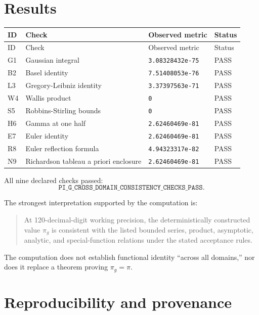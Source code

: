 \documentclass[11pt]{article}
\newcommand{\pig}{\pi_g}
\begin{document}
\section{Results}

\begin{longtable}{p{} p{} p{} p{}}
\toprule
ID & Check & Observed metric & Status \\
\midrule
\endfirsthead
\toprule
ID & Check & Observed metric & Status \\
\midrule
\endhead
G1 & Gaussian integral & \texttt{3.08328432e-75} & PASS \\
B2 & Basel identity & \texttt{7.51408053e-76} & PASS \\
L3 & Gregory-Leibniz identity & \texttt{3.37397563e-71} & PASS \\
W4 & Wallis product & \texttt{0} & PASS \\
S5 & Robbins-Stirling bounds & \texttt{0} & PASS \\
H6 & Gamma at one half & \texttt{2.62460469e-81} & PASS \\
E7 & Euler identity & \texttt{2.62460469e-81} & PASS \\
R8 & Euler reflection formula & \texttt{4.94323317e-82} & PASS \\
N9 & Richardson tableau a priori enclosure & \texttt{2.62460469e-81} & PASS \\
\bottomrule
\end{longtable}

All nine declared checks passed:
\[
\boxed{\texttt{PI\_G\_CROSS\_DOMAIN\_CONSISTENCY\_CHECKS\_PASS}}.
\]

The strongest interpretation supported by the computation is:

\begin{quote}
At 120-decimal-digit working precision, the deterministically constructed value $\pig$ is consistent with the listed bounded series, product, asymptotic, analytic, and special-function relations under the stated acceptance rules.
\end{quote}

The computation does not establish functional identity ``across all domains,'' nor does it replace a theorem proving $\pig=\pi$.

\section{Reproducibility and provenance}
\end{document}
